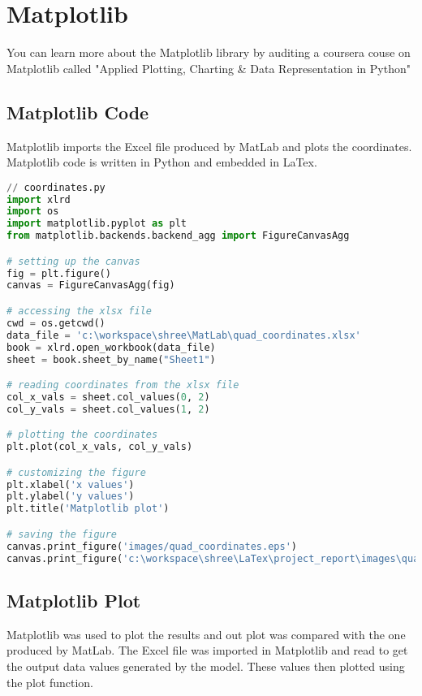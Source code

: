 \documentclass{article}
\begin{document}
\section{Matplotlib}
You can learn more about the Matplotlib library by auditing a coursera couse on Matplotlib called "Applied Plotting, Charting \& Data Representation in Python" \cite{matplotlibcoursera}

\subsection{Matplotlib Code}
Matplotlib imports the Excel file produced by MatLab and plots the coordinates. Matplotlib code is written in Python and embedded in LaTex\cite{matplotlibcode}. 

\begin{lstlisting}[language=Python, style=mystyle]
// coordinates.py
import xlrd
import os
import matplotlib.pyplot as plt
from matplotlib.backends.backend_agg import FigureCanvasAgg

# setting up the canvas
fig = plt.figure()
canvas = FigureCanvasAgg(fig)

# accessing the xlsx file
cwd = os.getcwd()
data_file = 'c:\workspace\shree\MatLab\quad_coordinates.xlsx'
book = xlrd.open_workbook(data_file)
sheet = book.sheet_by_name("Sheet1")

# reading coordinates from the xlsx file
col_x_vals = sheet.col_values(0, 2)
col_y_vals = sheet.col_values(1, 2)

# plotting the coordinates
plt.plot(col_x_vals, col_y_vals)

# customizing the figure
plt.xlabel('x values')
plt.ylabel('y values')
plt.title('Matplotlib plot')

# saving the figure
canvas.print_figure('images/quad_coordinates.eps')
canvas.print_figure('c:\workspace\shree\LaTex\project_report\images\quad_coordinates.eps')

\end{lstlisting}

\subsection{Matplotlib Plot}
Matplotlib was used to plot the results and out plot was compared with the one produced by MatLab. The Excel file was imported in Matplotlib and read to get the output data values generated by the model. These values then plotted using the plot function. \\
\end{document}
